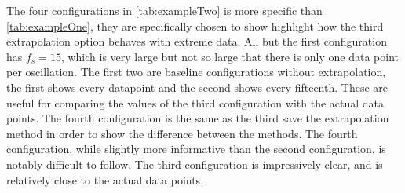 The four configurations in \cref{tab:exampleTwo} is more specific than \cref{tab:exampleOne}, they are specifically chosen to show highlight how the third extrapolation option behaves with extreme data.
All but the first configuration has $f_s=15$, which is very large but not so large that there is only one data point per oscillation.
The first two are baseline configurations without extrapolation, the first shows every datapoint and the second shows every fifteenth.
These are useful for comparing the values of the third configuration with the actual data points.
The fourth configuration is the same as the third save the extrapolation method in order to show the difference between the methods.
The fourth configuration, while slightly more informative than the second configuration, is notably difficult to follow.
The third configuration is impressively clear, and is relatively close to the actual data points.




